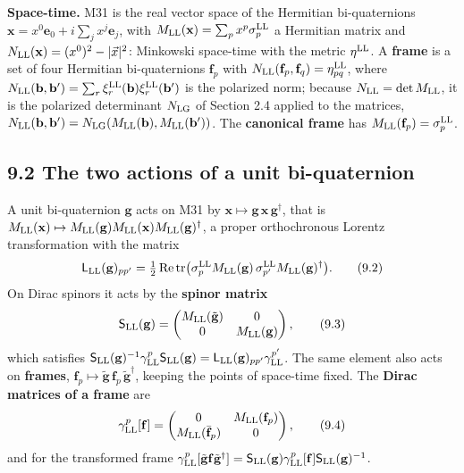\documentclass[
  10pt,
]{article}
\begin{document}
\textbf{Space-time.} M31 is the real vector space of the Hermitian
bi-quaternions \(\mathbf x=x^0\mathbf e_0+i\sum_jx^j\mathbf e_j\), with
\(M_{\rm LL}(\mathbf x)=\sum_px^p\sigma^{\rm LL}_p\) a Hermitian matrix
and \(N_{\rm LL}(\mathbf x)=(x^0)^2-|\vec x|^2\): Minkowski space-time
with the metric \(\eta^{\rm LL}\). A \textbf{frame} is a set of four
Hermitian bi-quaternions \(\mathbf f_p\) with
\(N_{\rm LL}(\mathbf f_p,\mathbf f_q)=\eta^{\rm LL}_{pq}\), where
\(N_{\rm LL}(\mathbf b,\mathbf b')=\sum_r\xi^{\rm LL}_r(\mathbf b)\xi^{\rm LL}_r(\mathbf b')\)
is the polarized norm; because \(N_{\rm LL}=\det M_{\rm LL}\), it is the
polarized determinant \(N_{\rm LG}\) of Section 2.4 applied to the
matrices,
\(N_{\rm LL}(\mathbf b,\mathbf b')=N_{\rm LG}(M_{\rm LL}(\mathbf b),M_{\rm LL}(\mathbf b'))\).
The \textbf{canonical frame} has
\(M_{\rm LL}(\mathbf f_p)=\sigma^{\rm LL}_p\).

\hypertarget{the-two-actions-of-a-unit-bi-quaternion}{%
\subsection{9.2 The two actions of a unit
bi-quaternion}\label{the-two-actions-of-a-unit-bi-quaternion}}

A unit bi-quaternion \(\mathbf g\) acts on M31 by
\(\mathbf x\mapsto\mathbf g\,\mathbf x\,\mathbf g^\dagger\), that is
\(M_{\rm LL}(\mathbf x)\mapsto M_{\rm LL}(\mathbf g)M_{\rm LL}(\mathbf x)M_{\rm LL}(\mathbf g)^\dagger\),
a proper orthochronous Lorentz transformation with the matrix
\[\mathsf L_{\rm LL}(\mathbf g)_{pp'}=\tfrac12\,\mathrm{Re}\,\mathrm{tr}\big(\sigma^{\rm LL}_pM_{\rm LL}(\mathbf g)\,\sigma^{\rm LL}_{p'}M_{\rm LL}(\mathbf g)^\dagger\big).\tag{9.2}\]
On Dirac spinors it acts by the \textbf{spinor matrix}
\[\mathsf S_{\rm LL}(\mathbf g)=\begin{pmatrix}M_{\rm LL}(\tilde{\mathbf g})&0\\0&M_{\rm LL}(\mathbf g)\end{pmatrix},\tag{9.3}\]
which satisfies
\(\mathsf S_{\rm LL}(\mathbf g)^{-1}\gamma^p_{\rm LL}\mathsf S_{\rm LL}(\mathbf g)=\mathsf L_{\rm LL}(\mathbf g)_{pp'}\gamma^{p'}_{\rm LL}\).
The same element also acts on \textbf{frames},
\(\mathbf f_p\mapsto\tilde{\mathbf g}\,\mathbf f_p\,\tilde{\mathbf g}^\dagger\),
keeping the points of space-time fixed. The \textbf{Dirac matrices of a
frame} are
\[\gamma^p_{\rm LL}[\mathbf f]=\begin{pmatrix}0&M_{\rm LL}(\mathbf f_p)\\M_{\rm LL}(\bar{\mathbf f}_p)&0\end{pmatrix},\tag{9.4}\]
and for the transformed frame
\(\gamma^p_{\rm LL}[\tilde{\mathbf g}\mathbf f\tilde{\mathbf g}^\dagger]=\mathsf S_{\rm LL}(\mathbf g)\gamma^p_{\rm LL}[\mathbf f]\mathsf S_{\rm LL}(\mathbf g)^{-1}\).
\end{document}
